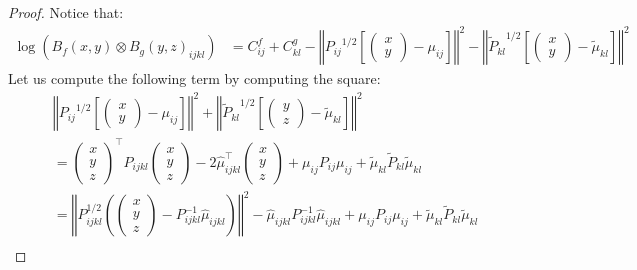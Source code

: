 \begin{proof}
Notice that:
    \begin{align}
        \log\left(B_f(x, y) \otimes B_g(y, z)_{ijkl}\right)& = C^f_{ij} + C^g_{kl} - \left\Vert {P_{ij}}^{1/2}\left[\begin{pmatrix}x\\ y\end{pmatrix}- \mu_{ij}\right]\right\Vert^2 - \left\Vert {\tilde P_{kl}}^{1/2}\left[\begin{pmatrix}x \\ y \end{pmatrix}- \tilde\mu_{kl}\right]\right\Vert^2
    \end{align}
Let us compute the following term by computing the square:
    \begin{align}
     &\left\Vert {P_{ij}}^{1/2}\left[\begin{pmatrix}x\\y\end{pmatrix}- \mu_{ij}\right]\right\Vert^2 + \left\Vert {\tilde P_{kl}}^{1/2}\left[\begin{pmatrix}y\\ z\end{pmatrix}- \tilde\mu_{kl}\right]\right\Vert^2 \\
     &= \begin{pmatrix}x\\ y\\ z\end{pmatrix}^\top P_{ijkl}\begin{pmatrix}x\\ y\\ z\end{pmatrix}- 2\hat\mu_{ijkl}^\top \begin{pmatrix}x\\ y\\ z\end{pmatrix} +\mu_{ij}P_{ij}\mu_{ij} + \tilde\mu_{kl}\tilde P_{kl}\tilde\mu_{kl}\\
     &= \left\Vert P_{ijkl}^{1/2}\left(\begin{pmatrix}x\\ y\\ z\end{pmatrix} - P_{ijkl}^{-1}\hat\mu_{ijkl}\right) \right\Vert^2 - \hat\mu_{ijkl}P_{ijkl}^{-1}\hat\mu_{ijkl}+\mu_{ij}P_{ij}\mu_{ij} + \tilde\mu_{kl}\tilde P_{kl}\tilde\mu_{kl}\\
    \end{align}


\end{proof}
